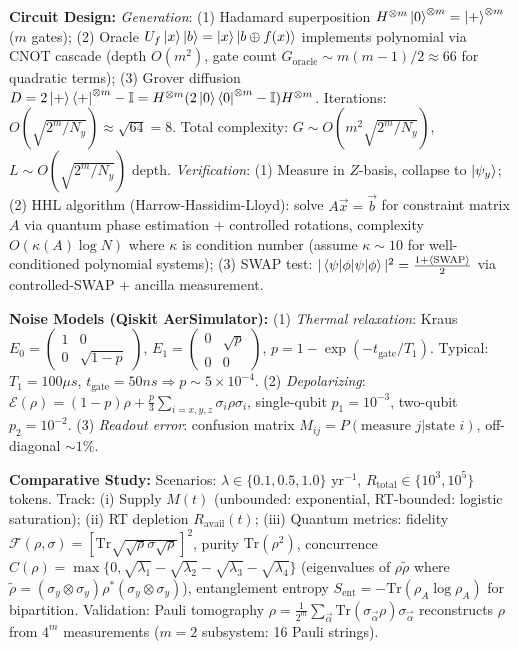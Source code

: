 \documentclass[a4paper,10pt,twoside]{article}
\begin{document}
\textbf{Circuit Design:} \textit{Generation}: (1) Hadamard superposition $H^{\otimes m}\ket{0}^{\otimes m} = \ket{+}^{\otimes m}$ ($m$ gates); (2) Oracle $U_f\ket{x}\ket{b} = \ket{x}\ket{b \oplus f(x)}$ implements polynomial via CNOT cascade (depth $O(m^2)$, gate count $G_{\text{oracle}} \sim m(m-1)/2 \approx 66$ for quadratic terms); (3) Grover diffusion $D = 2\ket{+}\bra{+}^{\otimes m} - \mathbb{I} = H^{\otimes m}(2\ket{0}\bra{0}^{\otimes m} - \mathbb{I})H^{\otimes m}$. Iterations: $O(\sqrt{2^m/N_y}) \approx \sqrt{64} = 8$. Total complexity: $G \sim O(m^2\sqrt{2^m/N_y})$, $L \sim O(\sqrt{2^m/N_y})$ depth. \textit{Verification}: (1) Measure in $Z$-basis, collapse to $\ket{\psi_y}$; (2) HHL algorithm (Harrow-Hassidim-Lloyd): solve $A\vec{x} = \vec{b}$ for constraint matrix $A$ via quantum phase estimation + controlled rotations, complexity $O(\kappa(A)\log N)$ where $\kappa$ is condition number (assume $\kappa \sim 10$ for well-conditioned polynomial systems); (3) SWAP test: $|\braket{\psi|\phi}|^2 = \frac{1 + \langle\text{SWAP}\rangle}{2}$ via controlled-SWAP + ancilla measurement.

\textbf{Noise Models (Qiskit AerSimulator):} (1) \textit{Thermal relaxation}: Kraus $E_0 = \begin{pmatrix}1 & 0\\0 & \sqrt{1-p}\end{pmatrix}$, $E_1 = \begin{pmatrix}0 & \sqrt{p}\\0 & 0\end{pmatrix}$, $p = 1-\exp(-t_{\text{gate}}/T_1)$. Typical: $T_1 = 100\mu s$, $t_{\text{gate}} = 50ns \Rightarrow p \sim 5\times10^{-4}$. (2) \textit{Depolarizing}: $\mathcal{E}(\rho) = (1-p)\rho + \frac{p}{3}\sum_{i=x,y,z}\sigma_i\rho\sigma_i$, single-qubit $p_1 = 10^{-3}$, two-qubit $p_2 = 10^{-2}$. (3) \textit{Readout error}: confusion matrix $M_{ij} = P(\text{measure } j|\text{state } i)$, off-diagonal $\sim 1\%$.

\textbf{Comparative Study:} Scenarios: $\lambda \in \{0.1, 0.5, 1.0\}$ yr$^{-1}$, $R_{\text{total}} \in \{10^3, 10^5\}$ tokens. Track: (i) Supply $M(t)$ (unbounded: exponential, RT-bounded: logistic saturation); (ii) RT depletion $R_{\text{avail}}(t)$; (iii) Quantum metrics: fidelity $\mathcal{F}(\rho,\sigma) = [\text{Tr}\sqrt{\sqrt{\rho}\sigma\sqrt{\rho}}]^2$, purity $\text{Tr}(\rho^2)$, concurrence $C(\rho) = \max\{0, \sqrt{\lambda_1} - \sqrt{\lambda_2} - \sqrt{\lambda_3} - \sqrt{\lambda_4}\}$ (eigenvalues of $\rho\tilde{\rho}$ where $\tilde{\rho} = (\sigma_y\otimes\sigma_y)\rho^*(\sigma_y\otimes\sigma_y)$), entanglement entropy $S_{\text{ent}} = -\text{Tr}(\rho_A\log\rho_A)$ for bipartition. Validation: Pauli tomography $\rho = \frac{1}{2^m}\sum_{\vec{\alpha}} \text{Tr}(\sigma_{\vec{\alpha}}\rho)\sigma_{\vec{\alpha}}$ reconstructs $\rho$ from $4^m$ measurements ($m=2$ subsystem: 16 Pauli strings).
\end{document}
